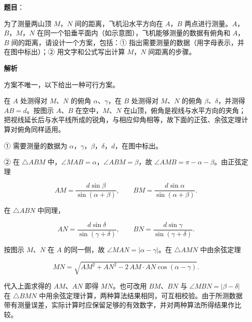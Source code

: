 \begin{answer}

\textbf{题目}：

为了测量两山顶 $M$，$N$ 间的距离，飞机沿水平方向在 $A$，$B$ 两点进行测量。$A$，$B$，$M$，$N$ 在同一个铅垂平面内（如示意图），飞机能够测量的数据有俯角和 $A$，$B$ 间的距离，请设计一个方案，包括：① 指出需要测量的数据（用字母表示，并在图中标出）；② 用文字和公式写出计算 $M$，$N$ 间距离的步骤。
\nopagebreak[4]
\begin{center}\end{center}
\nopagebreak[4]
\textbf{解析}

方案不唯一，以下给出一种可行方案。

在 $A$ 处测得对 $M$、$N$ 的俯角 $\alpha$、$\gamma$，在 $B$ 处测得对 $M$、$N$ 的俯角 $\beta$、$\delta$，并测得 $AB=d$。按图示 $A$、$B$ 在空中，$M$、$N$ 在山顶，俯角是视线与水平方向的夹角；把视线延长后与水平线所成的锐角，与相应仰角相等，故下面的正弦、余弦定理计算对俯角同样适用。

① 需要测量的数据为 $\alpha$，$\gamma$，$\beta$，$\delta$，$d$，在图中标出。

② 在 $\triangle ABM$ 中，$\angle MAB=\alpha$，$\angle ABM=\beta$，故 $\angle AMB=\pi-\alpha-\beta$。由正弦定理

\nopagebreak[4]
\[AM=\frac{d\sin\beta}{\sin(\alpha+\beta)},\qquad BM=\frac{d\sin\alpha}{\sin(\alpha+\beta)} .\]

在 $\triangle ABN$ 中同理，

\nopagebreak[4]
\[AN=\frac{d\sin\delta}{\sin(\gamma+\delta)},\qquad BN=\frac{d\sin\gamma}{\sin(\gamma+\delta)} .\]

按图示 $M$、$N$ 在 $A$ 的同一侧，故 $\angle MAN=|\alpha-\gamma|$。在 $\triangle AMN$ 中由余弦定理

\nopagebreak[4]
\[MN=\sqrt{AM^2+AN^2-2\,AM\cdot AN\cos(\alpha-\gamma)} .\]

代入上面求得的 $AM$、$AN$ 即得 $MN$。也可改用 $BM$、$BN$ 与 $\angle MBN=|\beta-\delta|$ 在 $\triangle BMN$ 中用余弦定理计算，两种算法结果相同，可互相校验。由于所测数据带有测量误差，实际计算时应保留足够的有效数字，并对两种算法所得结果作比较。


\end{answer}
